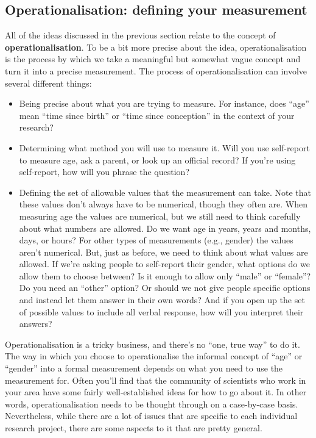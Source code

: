 \documentclass[
  a4paper,
]{book}
\begin{document}
\hypertarget{operationalisation-defining-your-measurement}{%
\subsection{Operationalisation: defining your
measurement}\label{operationalisation-defining-your-measurement}}

All of the ideas discussed in the previous section relate to the concept
of \textbf{operationalisation}. To be a bit more precise about the idea,
operationalisation is the process by which we take a meaningful but
somewhat vague concept and turn it into a precise measurement. The
process of operationalisation can involve several different things:

\begin{itemize}
\item
  Being precise about what you are trying to measure. For instance, does
  ``age'' mean ``time since birth'' or ``time since conception'' in the
  context of your research?
\item
  Determining what method you will use to measure it. Will you use
  self-report to measure age, ask a parent, or look up an official
  record? If you're using self-report, how will you phrase the question?
\item
  Defining the set of allowable values that the measurement can take.
  Note that these values don't always have to be numerical, though they
  often are. When measuring age the values are numerical, but we still
  need to think carefully about what numbers are allowed. Do we want age
  in years, years and months, days, or hours? For other types of
  measurements (e.g., gender) the values aren't numerical. But, just as
  before, we need to think about what values are allowed. If we're
  asking people to self-report their gender, what options do we allow
  them to choose between? Is it enough to allow only ``male'' or
  ``female''? Do you need an ``other'' option? Or should we not give
  people specific options and instead let them answer in their own
  words? And if you open up the set of possible values to include all
  verbal response, how will you interpret their answers?
\end{itemize}

Operationalisation is a tricky business, and there's no ``one, true
way'' to do it. The way in which you choose to operationalise the
informal concept of ``age'' or ``gender'' into a formal measurement
depends on what you need to use the measurement for. Often you'll find
that the community of scientists who work in your area have some fairly
well-established ideas for how to go about it. In other words,
operationalisation needs to be thought through on a case-by-case basis.
Nevertheless, while there are a lot of issues that are specific to each
individual research project, there are some aspects to it that are
pretty general.
\end{document}
